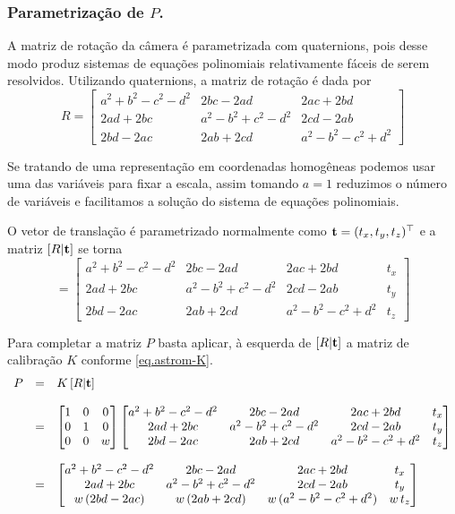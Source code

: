 \subsubsection*{Parametrização de $P$.}

A matriz de rotação da câmera é parametrizada com quaternions, pois desse modo produz sistemas de equações polinomiais relativamente fáceis de serem resolvidos. Utilizando quaternions, a matriz de rotação é dada por
\begin{equation*}
R=
\begin{bmatrix}
a^2+b^2-c^2-d^2&2bc-2ad&2ac+2bd\\
2ad+2bc&a^2-b^2+c^2-d^2&2cd-2ab\\
2bd-2ac&2ab+2cd&a^2-b^2-c^2+d^2
\end{bmatrix}
\end{equation*}

Se tratando de uma representação em coordenadas homogêneas podemos usar uma das variáveis para fixar a escala, assim tomando $a=1$ reduzimos o número de variáveis e facilitamos a solução do sistema de equações polinomiais.

O vetor de translação é parametrizado normalmente como ${\bf t}=(t_x,t_y,t_z)^\top$ e a matriz $[R|{\bf t}]$ se torna
\begin{equation*}
[R|{\bf t}]=
\begin{bmatrix}
a^2+b^2-c^2-d^2&2bc-2ad&2ac+2bd&t_x\\
2ad+2bc&a^2-b^2+c^2-d^2&2cd-2ab&t_y\\
2bd-2ac&2ab+2cd&a^2-b^2-c^2+d^2&t_z
\end{bmatrix}
\end{equation*}

Para completar a matriz $P$ basta aplicar, à esquerda de $[R|{\bf t}]$ a matriz de calibração $K$ conforme \ref{eq.astrom-K}.
\begin{equation*}
\begin{array}{rcl}
P&=&K\,[R|{\bf t}]\\\\
&=&
\begin{bmatrix}
1&0&0\\
0&1&0\\
0&0&w
\end{bmatrix}
\begin{bmatrix}
a^2+b^2-c^2-d^2&2bc-2ad&2ac+2bd&t_x\\
2ad+2bc&a^2-b^2+c^2-d^2&2cd-2ab&t_y\\
2bd-2ac&2ab+2cd&a^2-b^2-c^2+d^2&t_z
\end{bmatrix}\\\\
&=&
\begin{bmatrix}
a^2+b^2-c^2-d^2&2bc-2ad&2ac+2bd&t_x\\
2ad+2bc&a^2-b^2+c^2-d^2&2cd-2ab&t_y\\
w\,(2bd-2ac)&w\,(2ab+2cd)&w\,(a^2-b^2-c^2+d^2)&w\,t_z
\end{bmatrix}
\end{array}
\end{equation*} 


